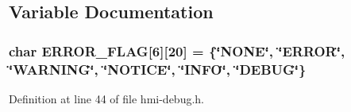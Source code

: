 \subsection{Variable Documentation}
\subsubsection[{\texorpdfstring{E\+R\+R\+O\+R\+\_\+\+F\+L\+AG}{ERROR_FLAG}}]{\setlength{\rightskip}{0pt plus 5cm}char E\+R\+R\+O\+R\+\_\+\+F\+L\+AG\mbox{[}6\mbox{]}\mbox{[}20\mbox{]} = \{\char`\"{}N\+O\+NE\char`\"{}, \char`\"{}E\+R\+R\+OR\char`\"{}, \char`\"{}W\+A\+R\+N\+I\+NG\char`\"{}, \char`\"{}N\+O\+T\+I\+CE\char`\"{}, \char`\"{}I\+N\+FO\char`\"{}, \char`\"{}D\+E\+B\+UG\char`\"{}\}\hspace{0.3cm}{\ttfamily [static]}}\hypertarget{include_2hmi-debug_8h_a13d4c7647aad2e84766f8b48a6caab09}{}\label{include_2hmi-debug_8h_a13d4c7647aad2e84766f8b48a6caab09}


Definition at line 44 of file hmi-\/debug.\+h.

